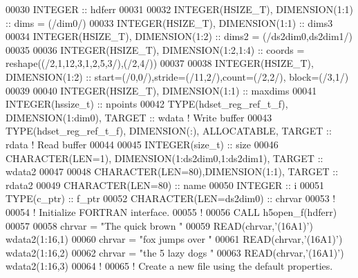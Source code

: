 \begin{DoxyCode}
00030   \textcolor{keywordtype}{INTEGER} :: hdferr
00031 
00032   \textcolor{keywordtype}{INTEGER(HSIZE\_T)}, \textcolor{keywordtype}{DIMENSION(1:1)}   :: dims = (/dim0/)
00033   \textcolor{keywordtype}{INTEGER(HSIZE\_T)}, \textcolor{keywordtype}{DIMENSION(1:1)}   :: dims3 
00034   \textcolor{keywordtype}{INTEGER(HSIZE\_T)}, \textcolor{keywordtype}{DIMENSION(1:2)}   :: dims2 = (/ds2dim0,ds2dim1/)
00035 
00036   \textcolor{keywordtype}{INTEGER(HSIZE\_T)}, \textcolor{keywordtype}{DIMENSION(1:2,1:4)} :: coords = reshape((/2,1,12,3,1,2,5,3/),(/2,4/))
00037   
00038   \textcolor{keywordtype}{INTEGER(HSIZE\_T)}, \textcolor{keywordtype}{DIMENSION(1:2)} :: start=(/0,0/),stride=(/11,2/),count=(/2,2/), block=(/3,1/)
00039 
00040   \textcolor{keywordtype}{INTEGER(HSIZE\_T)}, \textcolor{keywordtype}{DIMENSION(1:1)} :: maxdims
00041   \textcolor{keywordtype}{INTEGER(hssize\_t)} :: npoints
00042   \textcolor{keywordtype}{TYPE}(hdset\_reg\_ref\_t\_f), \textcolor{keywordtype}{DIMENSION(1:dim0)}, \textcolor{keywordtype}{TARGET} :: wdata \textcolor{comment}{! Write buffer}
00043   \textcolor{keywordtype}{TYPE}(hdset\_reg\_ref\_t\_f), \textcolor{keywordtype}{DIMENSION(:)}, \textcolor{keywordtype}{ALLOCATABLE}, \textcolor{keywordtype}{TARGET} :: rdata \textcolor{comment}{! Read buffer}
00044 
00045   \textcolor{keywordtype}{INTEGER(size\_t)} :: size
00046   \textcolor{keywordtype}{CHARACTER(LEN=1)}, \textcolor{keywordtype}{DIMENSION(1:ds2dim0,1:ds2dim1)}, \textcolor{keywordtype}{TARGET} :: wdata2
00047 
00048   \textcolor{keywordtype}{CHARACTER(LEN=80)},\textcolor{keywordtype}{DIMENSION(1:1)}, \textcolor{keywordtype}{TARGET} :: rdata2
00049   \textcolor{keywordtype}{CHARACTER(LEN=80)} :: name
00050   \textcolor{keywordtype}{INTEGER} :: i
00051   \textcolor{keywordtype}{TYPE}(c\_ptr) :: f\_ptr
00052   \textcolor{keywordtype}{CHARACTER(LEN=ds2dim0)} :: chrvar
00053   \textcolor{comment}{!}
00054   \textcolor{comment}{! Initialize FORTRAN interface.}
00055   \textcolor{comment}{!}
00056   \textcolor{keyword}{CALL }h5open\_f(hdferr)
00057 
00058   chrvar = \textcolor{stringliteral}{"The quick brown "}
00059   \textcolor{keyword}{READ}(chrvar,\textcolor{stringliteral}{'(16A1)'}) wdata2(1:16,1)
00060   chrvar = \textcolor{stringliteral}{"fox jumps over  "}
00061   \textcolor{keyword}{READ}(chrvar,\textcolor{stringliteral}{'(16A1)'}) wdata2(1:16,2)
00062   chrvar = \textcolor{stringliteral}{"the 5 lazy dogs "}
00063   \textcolor{keyword}{READ}(chrvar,\textcolor{stringliteral}{'(16A1)'}) wdata2(1:16,3)
00064   \textcolor{comment}{!}
00065   \textcolor{comment}{! Create a new file using the default properties.}

\end{DoxyCode}
